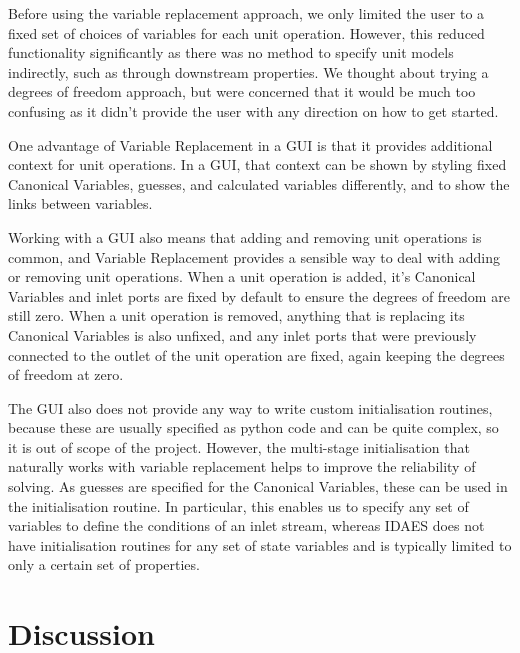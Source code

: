 Before using the variable replacement approach, we only limited the user
to a fixed set of choices of variables for each unit operation. However,
this reduced functionality significantly as there was no method to
specify unit models indirectly, such as through downstream properties.
We thought about trying a degrees of freedom approach, but were
concerned that it would be much too confusing as it didn't provide the
user with any direction on how to get started.

One advantage of Variable Replacement in a GUI is that it provides
additional context for unit operations. In a GUI, that context can be
shown by
styling fixed Canonical Variables, guesses, and calculated variables
differently, and to show the links between variables.

Working with a GUI also means that adding and removing unit operations
is common, and Variable Replacement provides a sensible way to deal with
adding or removing unit operations. When a unit operation is added, it's
Canonical Variables and inlet ports are fixed by default to ensure the
degrees of freedom are still zero. When a unit operation is removed,
anything that is replacing its Canonical Variables is also unfixed, and any
inlet ports that were previously connected to the outlet of the unit
operation are fixed, again keeping the degrees of freedom at zero.

The GUI also does not provide any way to write custom initialisation
routines, because these are usually specified as python code and can be
quite complex, so it is out of scope of the project. However, the
multi-stage initialisation that naturally works with variable
replacement helps to improve the reliability of solving. As guesses are
specified for the Canonical Variables, these can be used in the
initialisation routine. In particular, this enables us to specify any
set of variables to define the conditions of an inlet stream, whereas
IDAES does not have initialisation routines for any set of state
variables and is typically limited to only a certain set of properties.













\hypertarget{properties-of-a-variable-replacement-approach-to-equation-oriented-modelling}{%
\section{Discussion}\label{properties-of-a-variable-replacement-approach-to-equation-oriented-modelling}}

